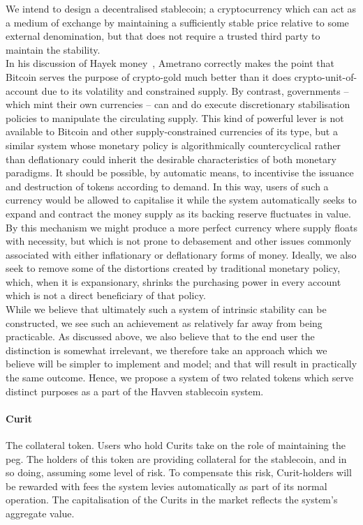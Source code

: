 \noindent We intend to design a decentralised stablecoin; a cryptocurrency which can act as a medium of exchange by maintaining a sufficiently stable price relative to some external denomination, but that does not require a trusted third party to maintain the stability.\\

\noindent  In his discussion of Hayek money~\cite{ametrano2016hayek}, Ametrano correctly makes the point that Bitcoin serves the purpose of crypto-gold much better than it does crypto-unit-of-account due to its volatility and constrained supply. By contrast, governments -- which mint their own currencies -- can and do execute discretionary stabilisation policies to manipulate the circulating supply. This kind of powerful lever is not available to Bitcoin and other supply-constrained currencies of its type, but a similar system whose monetary policy is algorithmically countercyclical rather than deflationary could inherit the desirable characteristics of both monetary paradigms. It should be possible, by automatic means, to incentivise the issuance and destruction of tokens according to demand. In this way, users of such a currency would be allowed to capitalise it while the system automatically seeks to expand and contract the money supply as its backing reserve fluctuates in value. By this mechanism we might produce a more perfect currency where supply floats with necessity, but which is not prone to debasement and other issues commonly associated with either inflationary or deflationary forms of money. Ideally, we also seek to remove some of the distortions created by traditional monetary policy, which, when it is expansionary, shrinks the purchasing power in every account which is not a direct beneficiary of that policy.\\

\noindent While we believe that ultimately such a system of intrinsic stability can be constructed, we see such an achievement as relatively far away from being practicable. As discussed above, we also believe that to the end user the distinction is somewhat irrelevant, we therefore take an approach which we believe will be simpler to implement and model; and that will result in practically the same outcome. Hence, we propose a system of two related tokens which serve distinct purposes as a part of the Havven stablecoin system.

\paragraph{Curit} The collateral token. Users who hold Curits take on the role of maintaining the peg. The holders of this token are providing collateral for the stablecoin, and in so doing, assuming some level of risk. To compensate this risk, Curit-holders will be rewarded with fees the system levies automatically as part of its normal operation. The capitalisation of the Curits in the market reflects the system's aggregate value.

